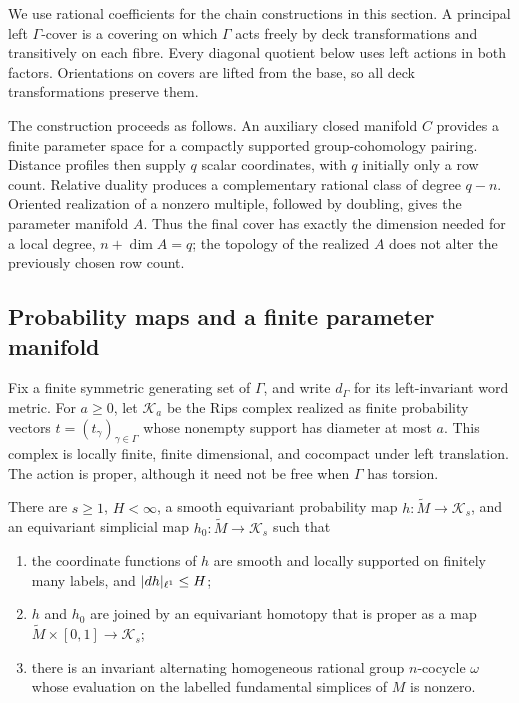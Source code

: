 We use rational coefficients for the chain constructions in this
section. A principal left $\Gamma$-cover is a covering on which $\Gamma$
acts freely by deck transformations and transitively on each fibre. Every
diagonal quotient below uses left actions in both factors.  Orientations
on covers are lifted from the base, so all deck transformations preserve
them.

The construction proceeds as follows. An auxiliary closed manifold $C$
provides a finite parameter space for a compactly supported group-cohomology
pairing. Distance profiles then supply $q$ scalar coordinates, with $q$
initially only a row count. Relative duality produces a complementary
rational class of degree $q-n$. Oriented realization of a nonzero multiple,
followed by doubling, gives the parameter manifold $A$. Thus the final cover has
exactly the dimension needed for a local degree, $n+\dim A=q$; the topology
of the realized $A$ does not alter the previously chosen row count.

\subsection{Probability maps and a finite parameter manifold}

Fix a finite symmetric generating set of $\Gamma$, and write
$d_\Gamma$ for its left-invariant word metric.  For $a\ge0$, let
$\mathcal K_a$ be the Rips complex realized as finite probability vectors
$t=(t_\gamma)_{\gamma\in\Gamma}$ whose nonempty support has diameter at
most $a$.  This complex is locally finite, finite dimensional, and
cocompact under left translation.  The action is proper, although it
need not be free when $\Gamma$ has torsion.

\begin{lemma}
\label{lem:probability-map}
There are $s\ge1$, $H<\infty$, a smooth equivariant probability map
$h:\widetilde M\to\mathcal K_s$, and an equivariant simplicial map
$h_0:\widetilde M\to\mathcal K_s$ such that
\begin{enumerate}
\item the coordinate functions of $h$ are smooth and locally supported
on finitely many labels, and $\lvert dh\rvert_{\ell^1}\le H$;
\item $h$ and $h_0$ are joined by an equivariant homotopy that is proper
as a map $\widetilde M\times[0,1]\to\mathcal K_s$;
\item there is an invariant alternating homogeneous rational group
$n$-cocycle $\omega$ whose evaluation on the labelled fundamental
simplices of $M$ is nonzero.
\end{enumerate}
\end{lemma}

